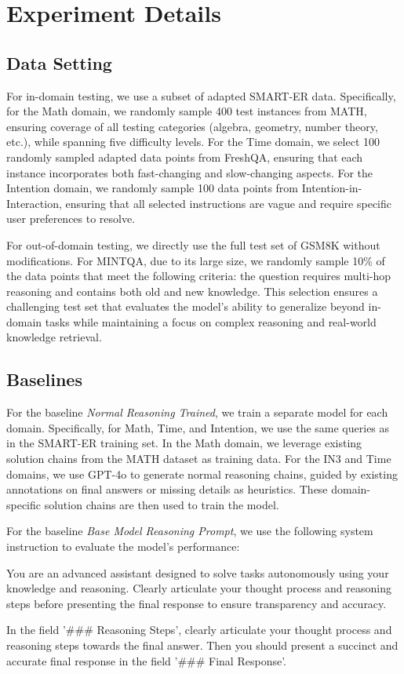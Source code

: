 \section{Experiment Details}
\label{apdx:experiment}
\subsection{Data Setting}
\label{apdx:setting_data}
For in-domain testing, we use a subset of adapted SMART-ER data. Specifically, for the Math domain, we randomly sample 400 test instances from MATH, ensuring coverage of all testing categories (algebra, geometry, number theory, etc.), while spanning five difficulty levels. For the Time domain, we select 100 randomly sampled adapted data points from FreshQA, ensuring that each instance incorporates both fast-changing and slow-changing aspects. For the Intention domain, we randomly sample 100 data points from Intention-in-Interaction, ensuring that all selected instructions are vague and require specific user preferences to resolve.  

For out-of-domain testing, we directly use the full test set of GSM8K without modifications. For MINTQA, due to its large size, we randomly sample 10\% of the data points that meet the following criteria: the question requires multi-hop reasoning and contains both old and new knowledge. This selection ensures a challenging test set that evaluates the model’s ability to generalize beyond in-domain tasks while maintaining a focus on complex reasoning and real-world knowledge retrieval.  
\subsection{Baselines}
\label{apdx:setting_baselines}
For the baseline \textit{Normal Reasoning Trained}, we train a separate model for each domain. Specifically, for Math, Time, and Intention, we use the same queries as in the SMART-ER training set. In the Math domain, we leverage existing solution chains from the MATH dataset as training data. For the IN3 and Time domains, we use GPT-4o to generate normal reasoning chains, guided by existing annotations on final answers or missing details as heuristics. These domain-specific solution chains are then used to train the model.

For the baseline \textit{Base Model Reasoning Prompt}, we use the following system instruction to evaluate the model's performance:
\begin{tcolorbox}[colback=gray!5!white, colframe=gray!75!black, 
title=Base Model Reasoning Prompt, boxrule=0.3mm, width=0.49\textwidth, arc=3mm, auto outer arc=true]
You are an advanced assistant designed to solve tasks autonomously using your knowledge and reasoning. Clearly articulate your thought process and reasoning steps before presenting the final response to ensure transparency and accuracy.

In the field '\#\#\# Reasoning Steps', clearly articulate your thought process and reasoning steps towards the final answer. Then you should present a succinct and accurate final response in the field '\#\#\# Final Response'.
\end{tcolorbox}

